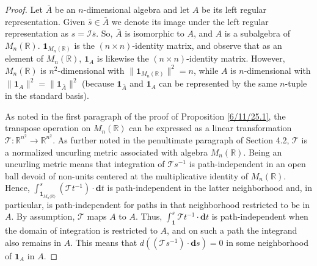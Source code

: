 \documentclass{amsart}
\theoremstyle{definition}
\numberwithin{theorem}{section}
\numberwithin{equation}{section}
\begin{document}
\begin{proof} 
Let $\bar{A}$ be an $n$-dimensional algebra and let $A$ be its left regular representation.  Given $\bar{s}\in\bar{A}$ we denote its image under the left regular representation as $s = \mathcal{I}\bar{s}$.
 So, $\bar{A}$ is isomorphic to $A$, and $A$ is a subalgebra of $ M_n(\mathbb{R})$.   $\mathbf{1}_{M_n(\mathbb{R})}$ is the $(n\times n)$-identity matrix, and observe that as an element of $ M_n(\mathbb{R})$, $\mathbf{1}_A$ is likewise the $(n\times n)$-identity matrix.  However, $ M_n(\mathbb{R})$ is $n^2$-dimensional with $\|\mathbf{1}_{M_n(\mathbb{R})}\|^2 = n$, while $A$ is $n$-dimensional with $\|\mathbf{1}_A\|^2 = \|\mathbf{1}_{\bar{A}}\|^2$ (because $\mathbf{1}_{\bar{A}}$ and  $\mathbf{1}_A$ can be represented by the same $n$-tuple in the standard basis).   

As noted in the first paragraph of the proof of Proposition \ref{6/11/25.1}, the transpose operation on $ M_n(\mathbb{R})$ can be expressed as a linear transformation $\mathcal{\mathcal{T}}:\mathbb{R}^{n^2}\rightarrow \mathbb{R}^{n^2}$.  As further noted in the penultimate paragraph of Section 4.2, $\mathcal{T}$ is a normalized uncurling metric associated with algebra  $ M_n(\mathbb{R})$.  Being an uncurling metric means that integration of $\mathcal{\mathcal{T}}s^{-1}$ is path-independent in an open ball devoid of non-units centered at the multiplicative identity of $ M_n(\mathbb{R})$.  
 Hence, $\int_{\mathbf{1}_{M_n({\mathbb{R})}}}^s (\mathcal{\mathcal{T}}t^{-1})\cdot \mathbf{d}t$ is path-independent in the latter neighborhood and, in particular, is path-independent for paths in that neighborhood restricted to be in $A$.  By assumption, $\mathcal{\mathcal{T}}$ maps $A$ to $A$. 
 Thus, $\int_\mathbf{1}^s \mathcal{\mathcal{T}}t^{-1}\cdot \mathbf{d}t$ is path-independent when the domain of integration is restricted to $A$, and on such a path the integrand also remains in $A$.  This means that 
  $d((\mathcal{\mathcal{T}}s^{-1})\cdot \mathbf{d}s) = 0$ in some neighborhood of $\mathbf{1}_A$ in $A$.
  

\end{proof}
\end{document}
